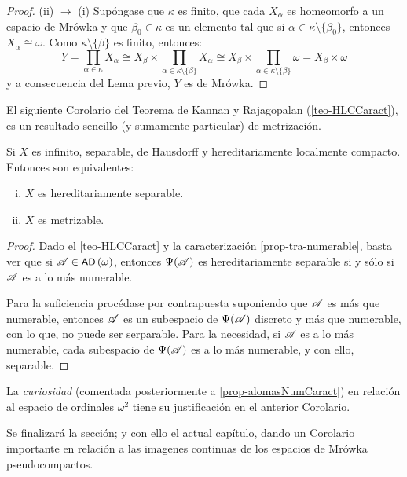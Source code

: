 \begin{proof}
		(ii) $\to$ (i) Supóngase que $\kappa$ es finito, que cada $X_\alpha$ es homeomorfo a un espacio de Mrówka y que $\beta_0 \in \kappa$ es un elemento tal que si $\alpha \in \kappa \setminus \{\beta_0\}$, entonces $X_\alpha \cong \omega$. Como $\kappa \setminus \{\beta\}$ es finito, entonces:
		$$ Y = \prod_{\alpha \in \kappa} X_\alpha \cong X_\beta \times \prod_{\alpha \in \kappa \setminus \{\beta\}} X_\alpha \cong X_\beta \times \prod_{\alpha \in \kappa \setminus \{\beta\}} \omega = X_\beta \times \omega $$
		y a consecuencia del Lema previo, $Y$ es de Mrówka.
	\end{proof}
	
	El siguiente Corolario del Teorema de Kannan y Rajagopalan (\ref{teo-HLCCaract}), es un resultado sencillo (y sumamente particular) de metrización.
	
	\begin{corolario}\label{cor-omegaCuadra}
		Si $X$ es infinito, separable, de Hausdorff y hereditariamente localmente compacto. Entonces son equivalentes:
		\begin{enumerate}[i)]
			\item $X$ es hereditariamente separable.
			\item $X$ es metrizable.
		\end{enumerate}
	\end{corolario}
	
	\begin{proof} 
		Dado el \autoref{teo-HLCCaract} y la caracterización \ref{prop-tra-numerable}, basta ver que si $\mathscr{A}\in \operatorname{\text{\textsf{\small AD}}}\,(\omega)$, entonces $\Psi(\mathscr{A})$ es hereditariamente separable si y sólo si $\mathscr{A}$ es a lo más numerable.
	
		Para la suficiencia procédase por contrapuesta suponiendo que $\mathscr{A}$ es más que numerable, entonces $\mathscr{A}$ es un subespacio de $\Psi(\mathscr{A})$ discreto y más que numerable, con lo que, no puede ser serparable. Para la necesidad, si $\mathscr{A}$ es a lo más numerable, cada subespacio de $\Psi(\mathscr{A})$ es a lo más numerable, y con ello, separable.
	\end{proof}
	
	La \textit{curiosidad} (comentada posteriormente a \ref{prop-alomasNumCaract}) en relación al espacio de ordinales $\omega^2$ tiene su justificación en el anterior Corolario.

	Se finalizará la sección; y con ello el actual capítulo, dando un Corolario importante en relación a las imagenes continuas de los espacios de Mrówka pseudocompactos.
	
